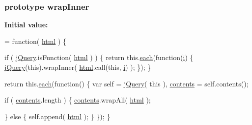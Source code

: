 \subsubsection[{wrap\+Inner}]{ {\bf prototype} wrap\+Inner}\label{jquery-1_810_82-vsdoc_8js_a41a3e550d6fe55baac11c61ed710ec2a}
{\bfseries Initial value\+:}
\begin{DoxyCode}
= \textcolor{keyword}{function}( \hyperlink{jquery-1_810_82-vsdoc_8js_a54a716632718016dd4e400e83a0970e2}{html} ) \{


        \textcolor{keywordflow}{if} ( \hyperlink{jquery-1_810_82-vsdoc_8js_add5237586d970a38a81f990e8eb28c6c}{jQuery}.isFunction( \hyperlink{jquery-1_810_82-vsdoc_8js_a54a716632718016dd4e400e83a0970e2}{html} ) ) \{
            \textcolor{keywordflow}{return} this.\hyperlink{jquery-1_810_82-vsdoc_8js_aae0bcb6b00035445a8f9b262c96ea8a2}{each}(\textcolor{keyword}{function}(\hyperlink{_bibabook_2_scripts_2respond_8min_8js_a5e25b1d1bed9ab5f3174b76d6a722180}{i}) \{
                \hyperlink{jquery-1_810_82-vsdoc_8js_add5237586d970a38a81f990e8eb28c6c}{jQuery}(\textcolor{keyword}{this}).wrapInner( \hyperlink{jquery-1_810_82-vsdoc_8js_a54a716632718016dd4e400e83a0970e2}{html}.call(\textcolor{keyword}{this}, \hyperlink{_bibabook_2_scripts_2respond_8min_8js_a5e25b1d1bed9ab5f3174b76d6a722180}{i}) );
            \});
        \}

        \textcolor{keywordflow}{return} this.\hyperlink{jquery-1_810_82-vsdoc_8js_aae0bcb6b00035445a8f9b262c96ea8a2}{each}(\textcolor{keyword}{function}() \{
            var \textcolor{keyword}{self} = \hyperlink{jquery-1_810_82-vsdoc_8js_add5237586d970a38a81f990e8eb28c6c}{jQuery}( \textcolor{keyword}{this} ),
                \hyperlink{jquery-1_810_82-vsdoc_8js_af81eeab332c74dc521f6610f4914badd}{contents} = \textcolor{keyword}{self}.contents();

            \textcolor{keywordflow}{if} ( \hyperlink{jquery-1_810_82-vsdoc_8js_af81eeab332c74dc521f6610f4914badd}{contents}.length ) \{
                \hyperlink{jquery-1_810_82-vsdoc_8js_af81eeab332c74dc521f6610f4914badd}{contents}.wrapAll( \hyperlink{jquery-1_810_82-vsdoc_8js_a54a716632718016dd4e400e83a0970e2}{html} );

            \} \textcolor{keywordflow}{else} \{
                \textcolor{keyword}{self}.append( \hyperlink{jquery-1_810_82-vsdoc_8js_a54a716632718016dd4e400e83a0970e2}{html} );
            \}
        \});
    \}
\end{DoxyCode}
